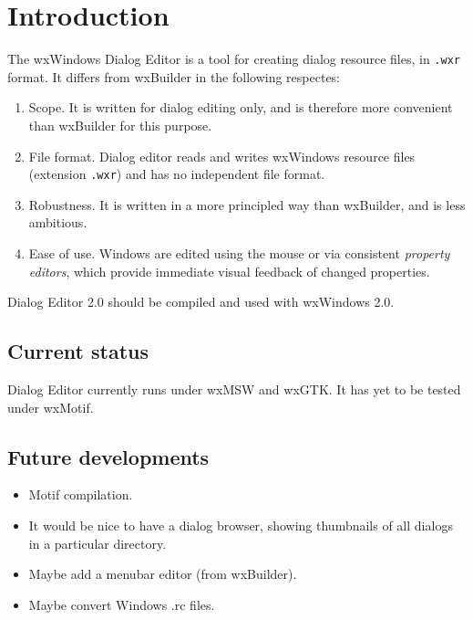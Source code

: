 \chapter{Introduction}\label{introduction}
%
%
\setfooter{\thepage}{}{}{}{}{\thepage}%

The wxWindows Dialog Editor is a tool for creating dialog resource files, in {\tt .wxr} format.
It differs from wxBuilder in the following respectes:

\begin{enumerate}\itemsep=0pt
\item Scope. It is written for dialog editing only, and is therefore more convenient than wxBuilder for this purpose.
\item File format. Dialog editor reads and writes wxWindows resource files (extension {\tt .wxr}) and has
no independent file format.
\item Robustness. It is written in a more principled way than wxBuilder, and is less ambitious.
\item Ease of use. Windows are edited using the mouse or via consistent {\it property editors}, which
provide immediate visual feedback of changed properties.
\end{enumerate}

Dialog Editor 2.0 should be compiled and used with wxWindows 2.0.

\section{Current status}

Dialog Editor currently runs under wxMSW and wxGTK. It has yet to
be tested under wxMotif.

\section{Future developments}

\begin{itemize}\itemsep=0pt
\item Motif compilation.
\item It would be nice to have a dialog browser, showing thumbnails of
all dialogs in a particular directory.
\item Maybe add a menubar editor (from wxBuilder).
\item Maybe convert Windows .rc files.
\end{itemize}

